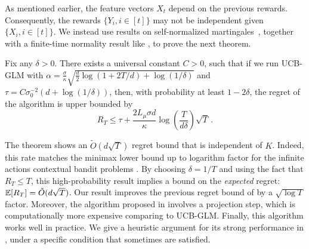 As mentioned earlier, the feature vectors $X_t$ depend on the previous rewards. Consequently, the rewards $\{Y_i, i \in [t]\}$ may not be independent given $\{X_i, i \in [t]\}$.  We instead use results on self-normalized martingales~\cite{abbasi2011improved}, together with a finite-time normality result like , to prove the next theorem.

\begin{theorem} \label{thm:main1}
Fix any $\delta>0$.  There exists a universal constant $C>0$, such that if we run UCB-GLM with $\alpha=\frac{\sigma}{\kappa} \sqrt{\frac{d}{2} \log(1+2T/d) + \log(1/\delta)}$ and $\tau=C\sigma_0^{-2}(d+\log(1/\delta))$, then, with probability at least $1-2\delta$, the regret of the algorithm is upper bounded by
\begin{equation*}
R_T \le \tau + \frac{2 L_{\mu} \sigma d}{\kappa} \log \left( \frac{T}{d\delta}\right) \sqrt{T} \,.
\end{equation*}
\end{theorem}

The theorem shows an $\tilde{O}(d\sqrt{T})$ regret bound that is independent of $K$. Indeed, this rate matches the minimax lower bound up to logarithm factor for the infinite actions contextual bandit problems \cite{dani2008stochastic}.  By choosing $\delta=1/T$ and using the fact that $R_T \le T$, this high-probability result implies a bound on the \emph{expected} regret: $\mathbb{E} [R_T] = \tilde{O}(d\sqrt{T})$.
%
Our result improves the previous regret bound of \citet{filippi2010parametric} by a $\sqrt{\log T}$ factor. Moreover, the algorithm proposed in \citet{filippi2010parametric} involves a projection step, which is computationally more expensive comparing to UCB-GLM.  Finally, this algorithm works well in practice. We give a heuristic argument for its strong performance in , under a specific condition that sometimes are satisfied.

\iffalse
Here we randomly choose $2d$ actions at the beginning to ensure $V_t$ is invertible when $t \ge 2d$. It is a technical assumption. Such assumption has also been made in \citet{filippi2010parametric}. In practice, we may choose a much smaller $\tau$. The choice of $\alpha$ is crucial in determining the regret $R_T$. A smaller $\alpha$ will sometimes leads to much smaller regret.
\lihong{May not need any more if IID assumption is made.}
\fi

